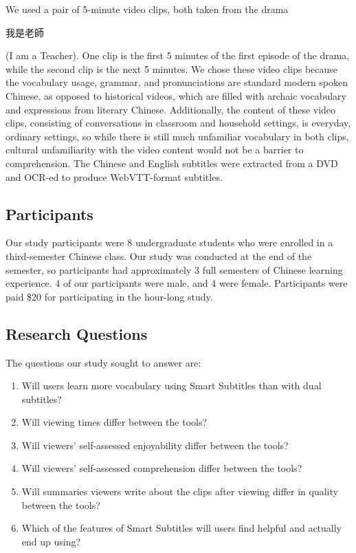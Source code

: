 \documentclass{sigchi}
\begin{document}
We used a pair of 5-minute video clips, both taken from the drama \begin{CJK}{UTF8}{min}我是老師\end{CJK} (I am a Teacher). One clip is the first 5 minutes of the first episode of the drama, while the second clip is the next 5 minutes. We chose these video clips because the vocabulary usage, grammar, and pronunciations are standard modern spoken Chinese, as opposed to historical videos, which are filled with archaic vocabulary and expressions from literary Chinese. Additionally, the content of these video clips, consisting of conversations in classroom and household settings, is everyday, ordinary settings, so while there is still much unfamiliar vocabulary in both clips, cultural unfamiliarity with the video content would not be a barrier to comprehension. The Chinese and English subtitles were extracted from a DVD and OCR-ed to produce WebVTT-format subtitles.

\subsection{Participants}

Our study participants were 8 undergraduate students who were enrolled in a third-semester Chinese class. Our study was conducted at the end of the semester, so participants had approximately 3 full semesters of Chinese learning experience. 4 of our participants were male, and 4 were female.
Participants were paid \$20 for participating in the hour-long study.

\subsection{Research Questions}

The questions our study sought to answer are:

\begin{enumerate}[noitemsep]
\item Will users learn more vocabulary using Smart Subtitles than with dual subtitles?
\item Will viewing times differ between the tools?
\item Will viewers' self-assessed enjoyability differ between the tools?
\item Will viewers' self-assessed comprehension differ between the tools?
\item Will summaries viewers write about the clips after viewing differ in quality between the tools?
\item Which of the features of Smart Subtitles will users find helpful and actually end up using?
\end{enumerate}
\end{document}
